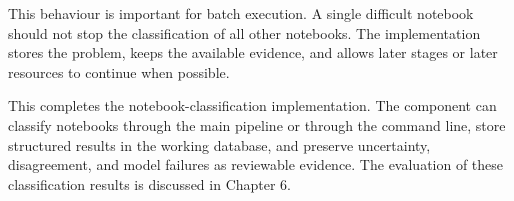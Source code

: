 This behaviour is important for batch execution. A single difficult notebook should not stop the classification of all other notebooks. The implementation stores the problem, keeps the available evidence, and allows later stages or later resources to continue when possible.

This completes the notebook-classification implementation. The component can classify notebooks through the main pipeline or through the command line, store structured results in the working database, and preserve uncertainty, disagreement, and model failures as reviewable evidence. The evaluation of these classification results is discussed in Chapter 6.
